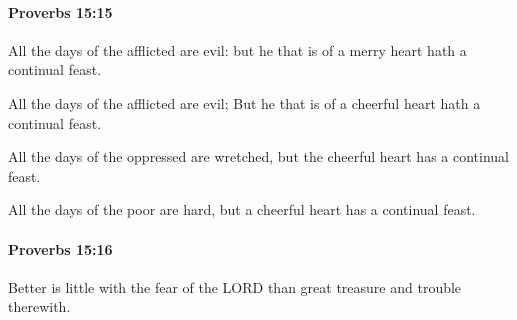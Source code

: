 		\paragraph{Proverbs 15:15} %
			\label{PROVERBS-15-15}

			All the days of the afflicted are evil: but he that is of a merry heart hath a continual feast.

			\begin{versebox}
					\item[BHS] 
					\item[ASV] All the days of the afflicted are evil; But he that is of a cheerful heart hath a continual feast.
					\item[NIV] All the days of the oppressed are wretched, but the cheerful heart has a continual feast.
					\item[NRSV] All the days of the poor are hard, but a cheerful heart has a continual feast.
			\end{versebox}

		\paragraph{Proverbs 15:16} %
			\label{PROVERBS-15-16}

			Better is little with the fear of the LORD than great treasure and trouble therewith.

